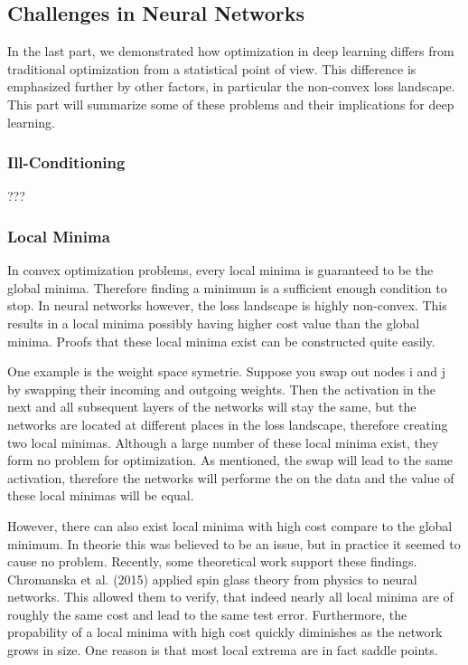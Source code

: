 \subsection{Challenges in Neural Networks}
In the last part, we demonstrated how optimization in deep learning differs from
traditional optimization from a statistical point of view. This difference is
emphasized further by other factors, in particular the non-convex loss
landscape. This part will summarize some of these problems and their
implications for deep learning.

\subsubsection{Ill-Conditioning}???


\subsubsection{Local Minima}
In convex optimization problems, every local minima is guaranteed to be the
global minima. Therefore finding a minimum is a sufficient enough condition to stop. In
neural networks however, the loss landscape is highly non-convex. This results
in a local minima possibly having higher cost value than the global minima.
Proofs that these local minima exist can be constructed quite easily.

One example is the weight space symetrie. Suppose you swap out nodes i and j by
swapping their incoming and outgoing weights. Then the activation in the next
and all subsequent layers of the networks will stay the same, but the networks
are located at different places in the loss landscape, therefore creating two
local minimas. Although a large number of these local minima exist, they form no
problem for optimization. As mentioned, the swap will lead to the same
activation, therefore the networks will performe the on the data and the value
of these local minimas will be equal.

However, there can also exist local minima with high cost compare to the global
minimum. In theorie this was believed to be an issue, but in practice it seemed
to cause no problem. Recently, some theoretical work support these findings.
Chromanska et al. (2015) applied spin glass theory from physics to neural
networks. This allowed them to verify, that indeed nearly all local minima are
of roughly the same cost and lead to the same test error. Furthermore, the
propability of a local minima with high cost quickly diminishes as the network
grows in size. One reason is that most local extrema are in fact saddle points.

